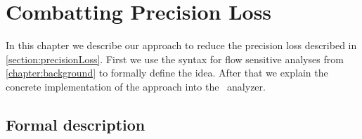 

\chapter{Combatting Precision Loss}\label{chapter:mainContributions}
  In this chapter we describe our approach to reduce the precision loss described in \autoref{section:precisionLoss}. First we use the syntax for flow sensitive analyses from \autoref{chapter:background} to formally define the idea. After that we explain the concrete implementation of the approach into the \gob\ analyzer.
  \section{Formal description}
